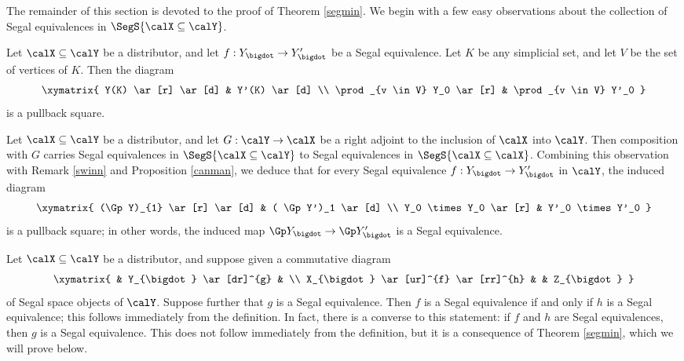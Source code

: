 The remainder of this section is devoted to the proof of Theorem \ref{segmin}.
We begin with a few easy observations about the collection of Segal equivalences
in $\SegS{\calX \subseteq \calY}$.

\begin{remark}\label{swinn}
Let $\calX \subseteq \calY$ be a distributor, and let $f: Y_{\bigdot} \rightarrow Y'_{\bigdot}$ 
be a Segal equivalence. Let $K$ be any simplicial set, and let $V$ be the set of vertices of
$K$. Then the diagram
$$ \xymatrix{ Y(K) \ar[r] \ar[d] & Y'(K) \ar[d] \\
\prod_{v \in V} Y_0 \ar[r] & \prod_{v \in V} Y'_0 }$$
is a pullback square.
\end{remark}

\begin{remark}
Let $\calX \subseteq \calY$ be a distributor, and let $G: \calY \rightarrow \calX$ be a right adjoint to the inclusion of $\calX$ into $\calY$. Then composition with $G$ carries Segal equivalences in
$\SegS{ \calX \subseteq \calY}$ to Segal equivalences in $\SegS{ \calX \subseteq \calX}$. Combining
this observation with Remark \ref{swinn} and Proposition \ref{canman}, we deduce that for every
Segal equivalence $f: Y_{\bigdot} \rightarrow Y'_{\bigdot}$ in $\calY$, the induced diagram
$$ \xymatrix{ (\Gp Y)_{1} \ar[r] \ar[d] & ( \Gp Y')_1 \ar[d] \\
Y_0 \times Y_0 \ar[r] & Y'_0 \times Y'_0 }$$
is a pullback square; in other words, the induced map $\Gp Y_{\bigdot} \rightarrow \Gp Y'_{\bigdot}$
is a Segal equivalence.
\end{remark}

\begin{remark}\label{humma}
Let $\calX \subseteq \calY$ be a distributor, and suppose given a commutative diagram
$$ \xymatrix{ & Y_{\bigdot} \ar[dr]^{g} & \\
X_{\bigdot} \ar[ur]^{f} \ar[rr]^{h} & & Z_{\bigdot} }$$
of Segal space objects of $\calY$. Suppose further that $g$ is a Segal equivalence. Then
$f$ is a Segal equivalence if and only if $h$ is a Segal equivalence; this follows immediately
from the definition. In fact, there is a converse to this statement: if $f$ and $h$ are Segal equivalences, then $g$ is a Segal equivalence. This does not follow immediately from the definition, but it is a consequence of Theorem \ref{segmin}, which we will prove below.
\end{remark}

